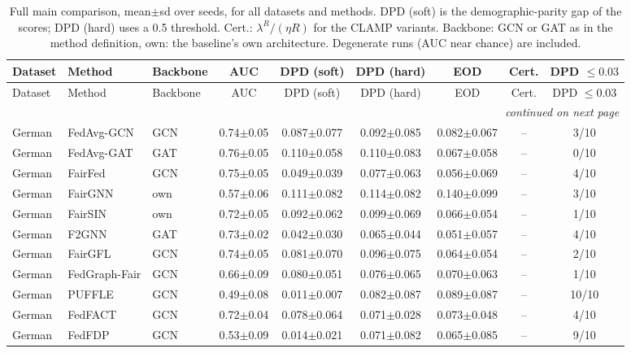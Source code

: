 \begin{longtable}{lp{3.2cm}lcccccc}
\caption{Full main comparison, mean$\pm$sd over seeds, for all datasets and methods. DPD (soft) is the demographic-parity gap of the scores; DPD (hard) uses a 0.5 threshold. Cert.: $\lambda^{R}/(\eta R)$ for the CLAMP variants. Backbone: GCN or GAT as in the method definition, own: the baseline's own architecture. Degenerate runs (AUC near chance) are included.}\label{tab:e1_full}\\
\toprule
Dataset & Method & Backbone & AUC & DPD (soft) & DPD (hard) & EOD & Cert. & DPD $\le 0.03$ \\
\midrule
\endfirsthead
\toprule
Dataset & Method & Backbone & AUC & DPD (soft) & DPD (hard) & EOD & Cert. & DPD $\le 0.03$ \\
\midrule
\endhead
\midrule
\multicolumn{9}{r}{\textit{continued on next page}} \\
\endfoot
\bottomrule
\endlastfoot
German & FedAvg-GCN & GCN & 0.74$\pm$0.05 & 0.087$\pm$0.077 & 0.092$\pm$0.085 & 0.082$\pm$0.067 & -- & 3/10 \\
German & FedAvg-GAT & GAT & 0.76$\pm$0.05 & 0.110$\pm$0.058 & 0.110$\pm$0.083 & 0.067$\pm$0.058 & -- & 0/10 \\
German & FairFed & GCN & 0.75$\pm$0.05 & 0.049$\pm$0.039 & 0.077$\pm$0.063 & 0.056$\pm$0.069 & -- & 4/10 \\
German & FairGNN & own & 0.57$\pm$0.06 & 0.111$\pm$0.082 & 0.114$\pm$0.082 & 0.140$\pm$0.099 & -- & 3/10 \\
German & FairSIN & own & 0.72$\pm$0.05 & 0.092$\pm$0.062 & 0.099$\pm$0.069 & 0.066$\pm$0.054 & -- & 1/10 \\
German & F2GNN & GAT & 0.73$\pm$0.02 & 0.042$\pm$0.030 & 0.065$\pm$0.044 & 0.051$\pm$0.057 & -- & 4/10 \\
German & FairGFL & GCN & 0.74$\pm$0.05 & 0.081$\pm$0.070 & 0.096$\pm$0.075 & 0.064$\pm$0.054 & -- & 2/10 \\
German & FedGraph-Fair & GCN & 0.66$\pm$0.09 & 0.080$\pm$0.051 & 0.076$\pm$0.065 & 0.070$\pm$0.063 & -- & 1/10 \\
German & PUFFLE & GCN & 0.49$\pm$0.08 & 0.011$\pm$0.007 & 0.082$\pm$0.087 & 0.089$\pm$0.087 & -- & 10/10 \\
German & FedFACT & GCN & 0.72$\pm$0.04 & 0.078$\pm$0.064 & 0.071$\pm$0.028 & 0.073$\pm$0.048 & -- & 4/10 \\
German & FedFDP & GCN & 0.53$\pm$0.09 & 0.014$\pm$0.021 & 0.071$\pm$0.082 & 0.065$\pm$0.085 & -- & 9/10 \\

\end{longtable}
